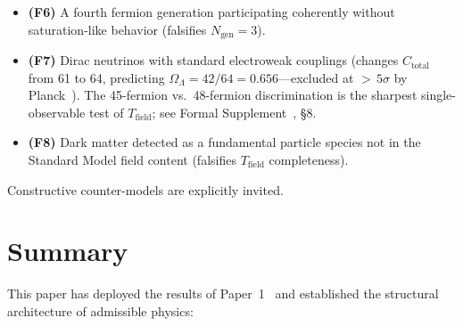 \documentclass[11pt]{article}
\newenvironment{varlist}{\begin{itemize}[nosep,leftmargin=2em]}{\end{itemize}}
\begin{document}
\begin{varlist}
\item \textbf{(F6)} A fourth fermion generation participating coherently without saturation-like behavior (falsifies $N_{\mathrm{gen}} = 3$).
\item \textbf{(F7)} Dirac neutrinos with standard electroweak couplings (changes $C_{\mathrm{total}}$ from 61 to 64, predicting $\Omega_\Lambda = 42/64 = 0.656$---excluded at ${>}\,5\sigma$ by Planck~\cite{Planck2020}).  The 45-fermion vs.\ 48-fermion discrimination is the sharpest single-observable test of $T_{\mathrm{field}}$; see Formal Supplement~\cite{BrookeP2Supplement}, \S8.
\item \textbf{(F8)} Dark matter detected as a fundamental particle species not in the Standard Model field content (falsifies $T_{\mathrm{field}}$ completeness).
\end{varlist}

Constructive counter-models are explicitly invited.


\section{Summary}
\label{sec:summary}

This paper has deployed the results of Paper~1~\cite{BrookePaper1} and established the structural architecture of admissible physics:
\end{document}
